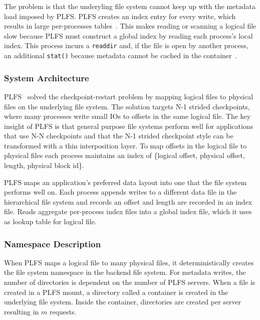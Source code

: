 The problem is that the underyling file system cannot keep up with the metadata
load imposed by PLFS. PLFS creates an index entry for every write, which
results in large per-processes tables~\cite{grider:pc17-diddlings}. This makes
reading or scanning a logical file slow because PLFS must construct a global
index by reading each process's local index. This process incurs a
\texttt{readdir} and, if the file is open by another process, an additional
\texttt{stat()} because metadata cannot be cached in the
container~\cite{bent_plfs_2009}.

\subsubsection{System Architecture}
PLFS~\cite{bent_plfs_2009} solved the checkpoint-restart problem by mapping logical
files to physical files on the underlying file system. The solution targets N-1
strided checkpoints, where many processes write small IOs to offsets in the
same logical file. The key insight of PLFS is that general purpose file systems
perform well for applications that use N-N checkpoints and that the N-1 strided
checkpoint style can be transformed with a thin interposition layer. To map
offsets in the logical file to physical files each process maintains an index
of \{logical offset, physical offset, length, physical block id\}. 

PLFS maps an application's preferred data layout into one that the file system
performs well on. Each process appends writes to a different data file in the
hierarchical file system and records an offset and length are recorded in an
index file. Reads aggregate per-process index files into a global index file,
which it uses as lookup table for logical file. 

\subsubsection{Namespace Description}

When PLFS maps a logical file to many physical files, it deterministically
creates the file system namespace in the backend file system.  For metadata
writes, the number of directories is dependent on the number of PLFS servers.
When a file is created in a PLFS mount, a directory called a container is
created in the underlying file system. Inside the container, directories are
created per server resulting in \(m\) requests. 

